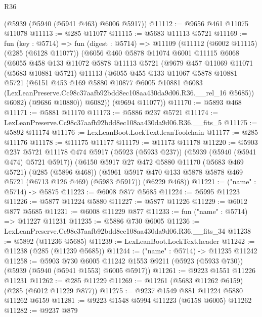 \begin{lexlean}{R36}
\begin{coremodule}
    (@5939 (@5940 (@5941 @463) @6006 @5917))
@11112 := @9656 @461 @11075 @11078
@11113 := @285 @11077
@11115 := @5683 @11113 @5721
@11169 := fun (key : @5714) =>
  fun (digest : @5714) =>
  @11109
    (@11112
      (@6002 @11115)
      (@285 (@6128 @11077))
      (@6056
        @460
        @5878
        @11074
        @6001
        @11115
        @6068
        (@6055
          @458
          @133
          @11072
          @5878
          @11113
          @5721
          (@9679
            @457
            @11069
            @11071
            (@5683 @10881 @5721)
            @11113
            (@6055
              @455
              @133
              @11067
              @5878
              @10881
              @5721
              (@6151
                @453
                @169
                @5880
                @10877
                @6005
                @10881
                @6083
                (LexLeanPreserve.Cc98c37aafb92bdd8ec108aa430da9d06.R36.__rel_16 @5685))
              @6082)
            (@9686 @10880))
          @6082))
      (@9694 @11077))
@11170 := @5893 @468
@11171 := @5881 @11170
@11173 := @5886 @237 @5721
@11174 := LexLeanPreserve.Cc98c37aafb92bdd8ec108aa430da9d06.R36.__fits_5
@11175 := @5892 @11174
@11176 := LexLeanBoot.LockText.leanToolchain
@11177 := @285 @11176
@11178 := @11175 @11177
@11179 := @11173 @11178
@11220 := @5903
    @237
    @5721
    @11178
    @474
    @5917
    (@5923 (@5933 @237))
    (@5939 (@5940 (@5941 @474) @5721 @5917))
    (@6150
      @5917
      @27
      @472
      @5880
      @11170
      (@5683 @469 @5721)
      (@285 (@5896 @468))
      (@5961 @5917 @470 @133 @5878 @5878 @469 @5721 (@6713 @126 @469) (@5983 @5917))
      (@6229 @468))
@11221 := ("name" : @5714) -> @5875
@11223 := @6008 @877 @5685
@11224 := @5995 @11223
@11226 := @5877 @11224 @5880
@11227 := @5877 @11226
@11229 := @6012 @877 @5685
@11231 := @6008 @11229 @877
@11233 := fun ("name" : @5714) => @11227 @11231
@11235 := @5886 @730 @6005
@11236 := LexLeanPreserve.Cc98c37aafb92bdd8ec108aa430da9d06.R36.__fits_34
@11238 := @5892 (@11236 @5685)
@11239 := LexLeanBoot.LockText.header
@11242 := @11238 (@285 (@11239 @5685))
@11244 := ("name" : @5714) -> @11235 @11242
@11258 := @5903
    @730
    @6005
    @11242
    @1553
    @9211
    (@5923 (@5933 @730))
    (@5939 (@5940 (@5941 @1553) @6005 @5917))
@11261 := @9223 @1551 @11226 @11231
@11262 := @285 @11229
@11269 := @11261 (@5683 @11262 @6159) (@285 (@6012 @11229 @877))
@11275 := @9237 @1549 @881 @11224 @5880 @11262 @6159
@11281 := @9223 @1548 @5994 @11223 (@6158 @6005) @11262
@11282 := @9237 @879

\end{coremodule}
\end{lexlean}
